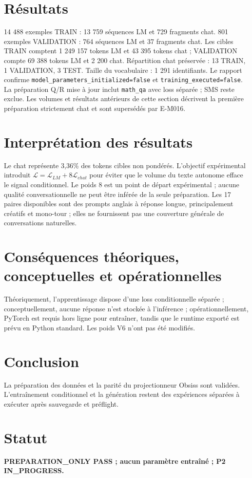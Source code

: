 \documentclass[11pt,a4paper]{report}
\begin{document}
\section{Résultats}
14 488 exemples TRAIN : 13 759 séquences LM et 729 fragments chat. 801 exemples VALIDATION : 764 séquences LM et 37 fragments chat. Les cibles TRAIN comptent 1 249 157 tokens LM et 43 395 tokens chat ; VALIDATION compte 69 388 tokens LM et 2 200 chat. Répartition chat préservée : 13 TRAIN, 1 VALIDATION, 3 TEST. Taille du vocabulaire : 1 291 identifiants. Le rapport confirme \texttt{model\_parameters}\allowbreak\texttt{\_initialized=false} et \texttt{training\_}\allowbreak\texttt{executed=false}. La préparation Q/R mise à jour inclut \texttt{math\_qa} avec loss séparée ; SMS reste exclue. Les volumes et résultats antérieurs de cette section décrivent la première préparation strictement chat et sont supersédés par E-M016.
\section{Interprétation des résultats}
Le chat représente 3,36\% des tokens cibles non pondérés. L'objectif expérimental introduit $\mathcal{L}=\mathcal{L}_{LM}+8\mathcal{L}_{chat}$ pour éviter que le volume du texte autonome efface le signal conditionnel. Le poids 8 est un point de départ expérimental ; aucune qualité conversationnelle ne peut être inférée de la seule préparation. Les 17 paires disponibles sont des prompts anglais à réponse longue, principalement créatifs et mono-tour ; elles ne fournissent pas une couverture générale de conversations naturelles.
\section{Conséquences théoriques, conceptuelles et opérationnelles}
Théoriquement, l'apprentissage dispose d'une loss conditionnelle séparée ; conceptuellement, aucune réponse n'est stockée à l'inférence ; opérationnellement, PyTorch est requis hors ligne pour entraîner, tandis que le runtime exporté est prévu en Python standard. Les poids V6 n'ont pas été modifiés.
\section{Conclusion}
La préparation des données et la parité du projectionneur Obsiss sont validées. L'entraînement conditionnel et la génération restent des expériences séparées à exécuter après sauvegarde et préflight.
\section{Statut}
\textbf{PREPARATION\_ONLY PASS ; aucun paramètre entraîné ; P2 IN\_PROGRESS.}
\end{document}
